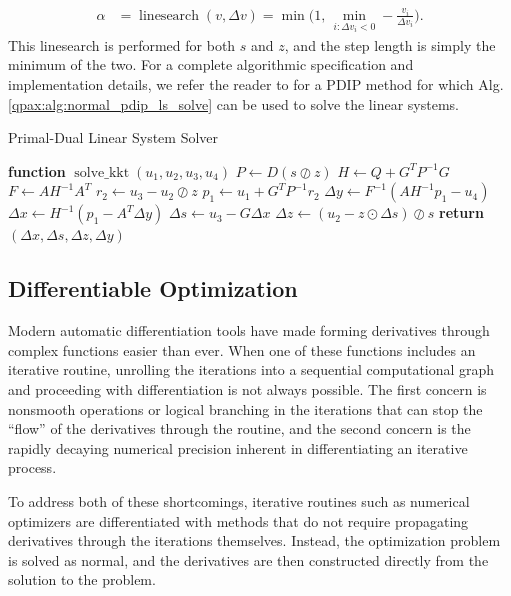 \begin{align}
    \alpha &= \operatorname{linesearch}(v, \Delta v) = \min \bigg( 1,\, \min_{i:\Delta v_i < 0} -\frac{v_i}{\Delta v_i} \bigg) .\label{qpax:sec:background:linesearch}
\end{align}
%
This linesearch is performed for both $s$ and $z$, and the step length is simply the minimum of the two. For a complete algorithmic specification and implementation details, we refer the reader to \cite{mattingley2012} for a PDIP method for which Alg. \eqref{qpax:alg:normal_pdip_ls_solve} can be used to solve the linear systems. 
%
\begin{algorithm}
\caption{Primal-Dual Linear System Solver}\label{qpax:alg:normal_pdip_ls_solve}
\begin{algorithmic}[1]
\State \textbf{function} $\operatorname{solve\_kkt}(u_1, u_2, u_3, u_4)$ 
\State $P \gets D(s \oslash  z)$ %
\State $H \gets Q + G^TP^{-1}G$ 
\State $F \gets A H^{-1} A^T$  
\State $r_2 \gets u_3 - u_2 \oslash z$ 
\State $p_1 \gets u_1 + G^T P^{-1}r_2$ 
\State $\Delta y \gets F^{-1}(A H^{-1}p_1 - u_4)$
\State $\Delta x \gets H^{-1}(p_1 - A^T\Delta y)$ 
\State $\Delta s \gets u_3 - G \Delta x$ 
\State $\Delta z \gets (u_2 - z \odot \Delta s) \oslash s$
\State \textbf{return} $(\Delta x, \Delta s, \Delta z, \Delta y)$
\end{algorithmic}
\end{algorithm}
%
%
\subsection{Differentiable Optimization}
Modern automatic differentiation tools have made forming derivatives through complex functions easier than ever. When one of these functions includes an iterative routine, unrolling the iterations into a sequential computational graph and proceeding with differentiation is not always possible. The first concern is nonsmooth operations or logical branching in the iterations that can stop the ``flow'' of the derivatives through the routine, and the second concern is the rapidly decaying numerical precision inherent in differentiating an iterative process.

To address both of these shortcomings, iterative routines such as numerical optimizers are differentiated with methods that do not require propagating derivatives through the iterations themselves. Instead, the optimization problem is solved as normal, and the derivatives are then constructed directly from the solution to the problem.
%
%
